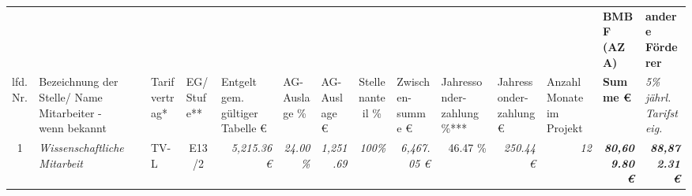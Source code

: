 \begin{table}[]
\begin{tabular}{clllcrrrrrrrrrr}
\rowcolor[HTML]{C6D9F1} 
\multicolumn{1}{l}{\cellcolor[HTML]{C6D9F1}\textbf{2028}}                               &                                                         &                             &                                   & \multicolumn{1}{l}{\cellcolor[HTML]{C6D9F1}} & \multicolumn{1}{l}{\cellcolor[HTML]{C6D9F1}}        & \multicolumn{1}{l}{\cellcolor[HTML]{C6D9F1}}          & \multicolumn{1}{l}{\cellcolor[HTML]{C6D9F1}} & \multicolumn{1}{l}{\cellcolor[HTML]{C6D9F1}}            & \multicolumn{1}{l}{\cellcolor[HTML]{C6D9F1}} & \multicolumn{1}{l}{\cellcolor[HTML]{C6D9F1}}   & \multicolumn{1}{l}{\cellcolor[HTML]{C6D9F1}} & \multicolumn{1}{l}{\cellcolor[HTML]{C6D9F1}} & \multicolumn{1}{l}{\cellcolor[HTML]{92D050}\textbf{BMBF (AZA)}} & \multicolumn{1}{l}{\cellcolor[HTML]{92D050}\textbf{andere Förderer}}                          \\
\multicolumn{1}{l}{lfd. Nr.}                                                            & Bezeichnung der Stelle/ Name Mitarbeiter - wenn bekannt &                             & Tarifvertrag*                     & \multicolumn{1}{l}{EG/ Stufe**}              & \multicolumn{1}{l}{Entgelt gem. gültiger Tabelle €} & \multicolumn{1}{l}{AG-Auslage \%}                     & \multicolumn{1}{l}{AG-Auslage €}             & \multicolumn{1}{c}{Stellenanteil \%}                    & \multicolumn{1}{l}{Zwischen-summe €}         & \multicolumn{1}{l}{Jahressonder-zahlung \%***} & \multicolumn{1}{l}{Jahressonder-zahlung €}   & \multicolumn{1}{l}{Anzahl Monate im Projekt} & \multicolumn{1}{l}{\textbf{Summe €}}                            & \multicolumn{1}{l}{\textit{5\% jährl. Tarifsteig.}}                                           \\
1                                                                                       & \multicolumn{2}{l}{\cellcolor[HTML]{FFFF99}\textit{Wissenschaftliche Mitarbeit}}      & \cellcolor[HTML]{FFFF99}TV-L      & \cellcolor[HTML]{FFFF99}E13/2                & \cellcolor[HTML]{FFFF99}\textit{5,215.36 €}         & \textit{24.00\%}                                      & \textit{1,251.69}                            & \cellcolor[HTML]{FFFF99}\textit{100\%}                  & \cellcolor[HTML]{92D050}\textit{6,467.05 €}  & 46.47 \%                                       & \cellcolor[HTML]{92D050}\textit{250.44 €}    & \cellcolor[HTML]{FFFF99}\textit{12}          & \cellcolor[HTML]{BFBFBF}\textit{\textbf{80,609.80 €}}           & \textit{\textbf{88,872.31 €}}                                                                 \\

\end{tabular}
\end{table}
